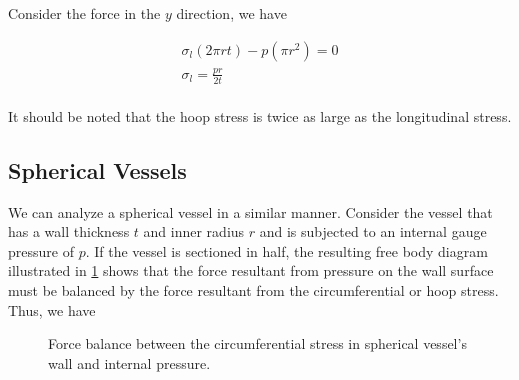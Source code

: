 \documentclass[
10pt,
a4paper,
openany,
svgnames,
]{book} %
\begin{document}
Consider the force in the $y$ direction, we have

\begin{equation}
  \begin{gathered}
    {\sigma _l}(2\pi rt) - p(\pi {r^2}) = 0 \\ 
    {\sigma _l} = \frac{pr}{2t} \\ 
  \end{gathered}
\end{equation}

It should be noted that the hoop stress is twice as large as the longitudinal stress.

\subsection{Spherical Vessels}

We can analyze a spherical vessel in a similar manner. Consider the vessel that has a wall thickness $t$ and inner radius $r$ and is subjected to an internal gauge pressure of $p$. If the vessel is sectioned in half, the resulting free body diagram illustrated in \cref{fig: spherical vessel} shows that the force resultant from pressure on the wall surface must be balanced by the force resultant from the circumferential or hoop stress. Thus, we have

\begin{figure}[h]
  \centering
  \caption{Force balance between the circumferential stress in spherical vessel's wall and internal pressure.}
  \label{fig: spherical vessel}
\end{figure}
\end{document}

